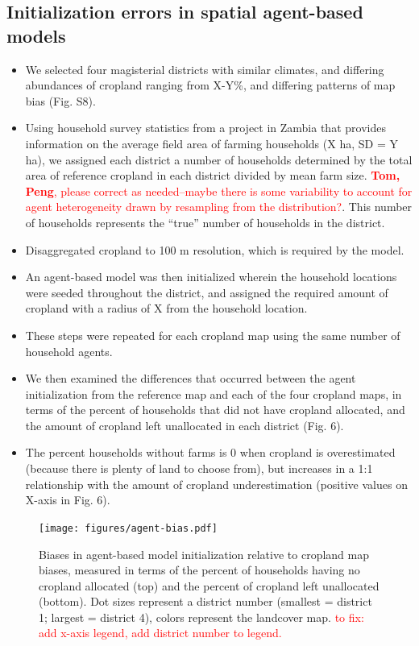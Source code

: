 \documentclass{pnastwo}
\begin{document}
\begin{article}
\subsection{Initialization errors in spatial agent-based models}

\begin{itemize}
  \item We selected four magisterial districts with similar climates, and differing abundances of cropland ranging from X-Y\%, and differing patterns of map bias (Fig. S8). 
  \item Using household survey statistics from a project in Zambia that provides information on the average field area of farming households (X ha, SD = Y ha), we assigned each district a number of households determined by the total area of reference cropland in each district divided by mean farm size. \textcolor{red}{\textbf{Tom, Peng}, please correct as needed--maybe there is some variability to account for agent heterogeneity drawn by resampling from the distribution?}. This number of households represents the ``true'' number of households in the district.
  \item Disaggregated cropland to 100 m resolution, which is required by the model. 
  \item An agent-based model was then initialized wherein the household locations were seeded throughout the district, and assigned the required amount of cropland with a radius of X from the household location.
  \item These steps were repeated for each cropland map using the same number of household agents. 
  \item We then examined the differences that occurred between the agent initialization from the reference map and each of the four cropland maps, in terms of the percent of households that did not have cropland allocated, and the amount of cropland left unallocated in each district (Fig. 6).  
  \item The percent households without farms is 0 when cropland is overestimated (because there is plenty of land to choose from), but increases in a 1:1 relationship with the amount of cropland underestimation (positive values on X-axis in Fig. 6). \end{itemize} 

\vspace{-0.5 cm}
\begin{figure}[ht]
\centerline{\texttt{[image: figures/agent-bias.pdf]}}
\caption{Biases in agent-based model initialization relative to cropland map biases, measured in terms of the percent of households having no cropland allocated (top) and the percent of cropland left unallocated (bottom). Dot sizes represent a district number (smallest = district 1; largest = district 4), colors represent the landcover map.  \textcolor{red}{to fix: add x-axis legend, add district number to legend.}}
\label{afoto}
\end{figure}


\end{article}
\end{document}
